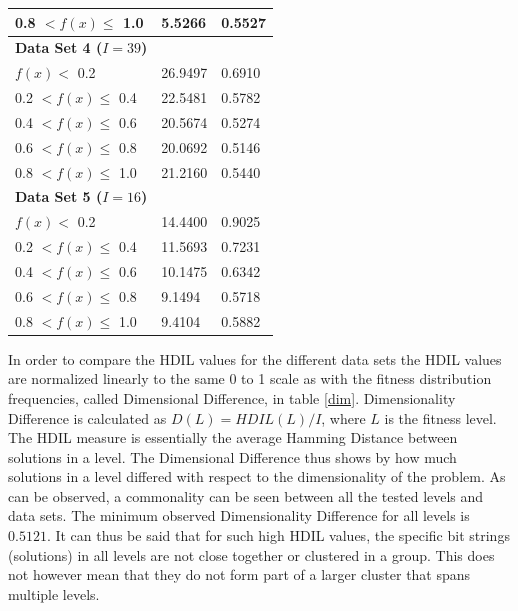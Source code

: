 \documentclass[journal,comsoc]{IEEEtran}
\begin{document}
\begin{table}[H]
\begin{tabular}{lll}
\multicolumn{1}{|l|}{0.8 $ < f(x) \leq $ 1.0} & \multicolumn{1}{l|}{5.5266} & \multicolumn{1}{l|}{0.5527} \\ \hline
\textbf{Data Set 4 ($I = 39$)} &   \\ \hline
\multicolumn{1}{|l|}{$ f(x) < $ 0.2} & \multicolumn{1}{l|}{26.9497} & \multicolumn{1}{l|}{0.6910} \\ \hline
\multicolumn{1}{|l|}{0.2 $ < f(x) \leq $ 0.4} & \multicolumn{1}{l|}{22.5481} & \multicolumn{1}{l|}{0.5782} \\ \hline
\multicolumn{1}{|l|}{0.4 $ < f(x) \leq $ 0.6} & \multicolumn{1}{l|}{20.5674} & \multicolumn{1}{l|}{0.5274} \\ \hline
\multicolumn{1}{|l|}{0.6 $ < f(x) \leq $ 0.8} & \multicolumn{1}{l|}{20.0692} & \multicolumn{1}{l|}{0.5146} \\ \hline
\multicolumn{1}{|l|}{0.8 $ < f(x) \leq $ 1.0} & \multicolumn{1}{l|}{21.2160} & \multicolumn{1}{l|}{0.5440} \\ \hline
\textbf{Data Set 5 ($I = 16$)} &  \\ \hline
\multicolumn{1}{|l|}{$ f(x) < $ 0.2} & \multicolumn{1}{l|}{14.4400} & \multicolumn{1}{l|}{0.9025} \\ \hline
\multicolumn{1}{|l|}{0.2 $ < f(x) \leq $ 0.4} & \multicolumn{1}{l|}{11.5693} & \multicolumn{1}{l|}{0.7231} \\ \hline
\multicolumn{1}{|l|}{0.4 $ < f(x) \leq $ 0.6} & \multicolumn{1}{l|}{10.1475} & \multicolumn{1}{l|}{0.6342} \\ \hline
\multicolumn{1}{|l|}{0.6 $ < f(x) \leq $ 0.8} & \multicolumn{1}{l|}{9.1494} & \multicolumn{1}{l|}{0.5718} \\ \hline
\multicolumn{1}{|l|}{0.8 $ < f(x) \leq $ 1.0} & \multicolumn{1}{l|}{9.4104} & \multicolumn{1}{l|}{0.5882} \\ \hline
\end{tabular}
\end{table}

 In order to compare the HDIL values for the different data sets the HDIL values are normalized linearly to the same 0 to 1 scale as with the fitness distribution frequencies, called Dimensional Difference, in table \ref{dim}. Dimensionality Difference is calculated as $ D(L) = HDIL(L)/I$, where $L$ is the fitness level. The HDIL measure is essentially the average Hamming Distance between solutions in a level. The Dimensional Difference thus shows by how much solutions in a level differed with respect to the dimensionality of the problem. As can be observed, a commonality can be seen between all the tested levels and data sets. The minimum observed Dimensionality Difference for all levels is $0.5121$. It can thus be said that for such high HDIL values, the specific bit strings (solutions) in all levels are not close together or clustered in a group. This does not however mean that they do not form part of a larger cluster that spans multiple levels.
\end{document}
